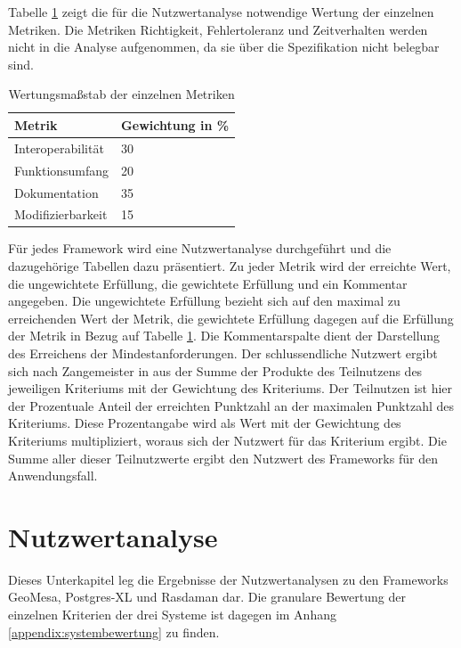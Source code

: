 Tabelle \ref{table:Wertungsmassstab} zeigt die für die Nutzwertanalyse notwendige Wertung der einzelnen Metriken.
Die Metriken Richtigkeit, Fehlertoleranz und Zeitverhalten werden nicht in die Analyse aufgenommen, da sie über die Spezifikation nicht belegbar sind.
\begin{table}[h!]
\centering
\begin{tabular}{|l|l|}
\hline
\textbf{Metrik} & \textbf{Gewichtung in \%} \\ \hline
Interoperabilität & 30 \\ \hline
Funktionsumfang & 20 \\ \hline
Dokumentation & 35 \\ \hline
Modifizierbarkeit & 15 \\ \hline
\end{tabular}
\caption{Wertungsmaßstab der einzelnen Metriken}
\label{table:Wertungsmassstab}
\end{table}
Für jedes Framework wird eine Nutzwertanalyse durchgeführt und die dazugehörige Tabellen dazu präsentiert.
Zu jeder Metrik wird der erreichte Wert, die ungewichtete Erfüllung, die gewichtete Erfüllung und ein Kommentar angegeben.
Die ungewichtete Erfüllung bezieht sich auf den maximal zu erreichenden Wert der Metrik, die gewichtete Erfüllung dagegen auf die Erfüllung der Metrik in Bezug auf Tabelle \ref{table:Wertungsmassstab}.
Die Kommentarspalte dient der Darstellung des Erreichens der Mindestanforderungen.
Der schlussendliche Nutzwert ergibt sich nach Zangemeister in \cite{website:nutzwertanalyse} aus der Summe der Produkte des Teilnutzens des jeweiligen Kriteriums mit der Gewichtung des Kriteriums.
Der Teilnutzen ist hier der Prozentuale Anteil der erreichten Punktzahl an der maximalen Punktzahl des Kriteriums.
Diese Prozentangabe wird als Wert mit der Gewichtung des Kriteriums multipliziert, woraus sich der Nutzwert für das Kriterium ergibt.
Die Summe aller dieser Teilnutzwerte ergibt den Nutzwert des Frameworks für den Anwendungsfall.

\section{Nutzwertanalyse}
Dieses Unterkapitel leg die Ergebnisse der Nutzwertanalysen zu den Frameworks GeoMesa, Postgres-XL und Rasdaman dar.
Die granulare Bewertung der einzelnen Kriterien der drei Systeme ist dagegen im Anhang \ref{appendix:systembewertung} zu finden.

